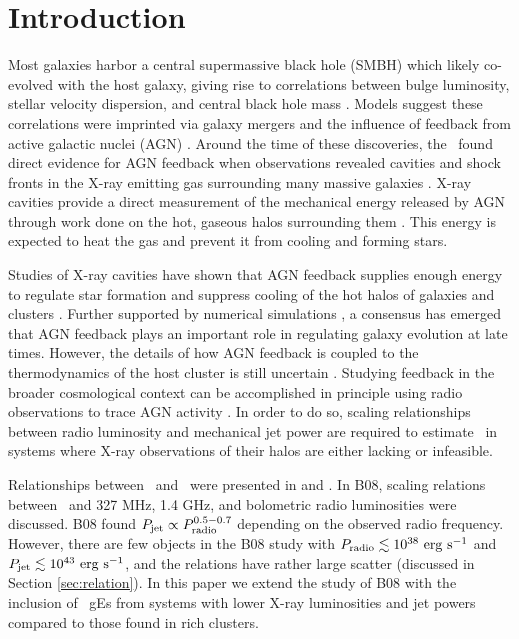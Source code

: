 \documentclass{emulateapj}
\begin{document}
\section{Introduction}
\label{sec:intro}

Most galaxies harbor a central supermassive black hole (SMBH) which
likely co-evolved with the host galaxy, giving rise to correlations
between bulge luminosity, stellar velocity dispersion, and central
black hole mass \citep{1995ARA&A..33..581K, magorrian}. Models suggest
these correlations were imprinted via galaxy mergers and the influence
of feedback from active galactic nuclei (AGN)
\citep[\eg][]{1998A&A...331L...1S, 2000MNRAS.311..576K}. Around the
time of these discoveries, the \cxo\ found direct evidence for AGN
feedback when observations revealed cavities and shock fronts in the
X-ray emitting gas surrounding many massive galaxies
\citep[\eg][]{perseus1, 2000ApJ...534L.135M}. X-ray cavities provide a
direct measurement of the mechanical energy released by AGN through
work done on the hot, gaseous halos surrounding them
\citep{2000ApJ...534L.135M}. This energy is expected to heat the gas
\citep{2001ApJ...554..261C} and prevent it from cooling and forming
stars.

Studies of X-ray cavities have shown that AGN feedback supplies enough
energy to regulate star formation and suppress cooling of the hot
halos of galaxies and clusters \citep{birzan04, 2005MNRAS.364.1343D,
  rafferty06}. Further supported by numerical simulations
\citep[\eg][]{croton06, bower06}, a consensus has emerged that AGN
feedback plays an important role in regulating galaxy evolution at
late times. However, the details of how AGN feedback is coupled to the
thermodynamics of the host cluster is still uncertain
\citep{2008ASPC..386..343D, 2009arXiv0910.3691M}. Studying feedback in
the broader cosmological context can be accomplished in principle
using radio observations to trace AGN activity
\citep[\eg][]{best07}. In order to do so, scaling relationships
between radio luminosity and mechanical jet power are required to
estimate \pjet\ in systems where X-ray observations of their halos are
either lacking or infeasible.

Relationships between \pjet\ and \prad\ were presented in
\citet[][hereafter B04]{birzan04} and \citet[][hereafter
  B08]{birzan08}. In B08, scaling relations between \pjet\ and 327
MHz, 1.4 GHz, and bolometric radio luminosities were discussed. B08
found $P_{\rm{jet}} \propto P_{\rm{radio}}^{0.5-0.7}$ depending on the observed radio
frequency. However, there are few objects in the B08 study with $P_{\rm{radio}}
\lesssim 10^{38} ~\rm{\mbox{\ensuremath{\rm{erg}}}~\ensuremath{\rm{\mbox{\ensuremath{\rm{s}}}^{-1}}}}$ and $P_{\rm{jet}} \lesssim 10^{43} ~\rm{\mbox{\ensuremath{\rm{erg}}}~\ensuremath{\rm{\mbox{\ensuremath{\rm{s}}}^{-1}}}}$, and the
relations have rather large scatter (discussed in Section
\ref{sec:relation}). In this paper we extend the study of B08 with the
inclusion of \samp\ gEs from systems with lower X-ray luminosities and
jet powers compared to those found in rich clusters.
\end{document}
